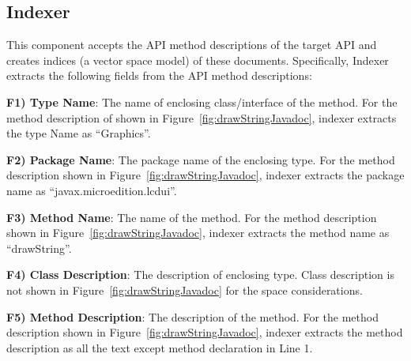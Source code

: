 \subsection{Indexer}
\label{sub:Approach_Indexer}

This component accepts the API method descriptions of the target API
and creates indices (a vector space model) of these documents.
Specifically, Indexer extracts the following fields from the API method descriptions:

 
\textbf{F1) Type Name}: The name of enclosing class/interface of the method. For the method description of  shown in Figure~\ref{fig:drawStringJavadoc}, indexer extracts the type Name as ``Graphics''.
	
\textbf{F2) Package Name}: The package name of the enclosing type. For the method description shown in Figure~\ref{fig:drawStringJavadoc}, indexer extracts the package name as ``javax.microedition.lcdui''.
	
\textbf{F3) Method Name}: The name of the method. For the method description shown in Figure~\ref{fig:drawStringJavadoc}, indexer extracts the method name as ``drawString''.
	
%	
%	
%	
	
\textbf{F4) Class Description}: The description of enclosing type. Class description is not shown in Figure~\ref{fig:drawStringJavadoc} for the space considerations.
	
\textbf{F5) Method Description}: The description of the method. For the method description shown in Figure~\ref{fig:drawStringJavadoc}, indexer extracts the method description as all the text except method declaration in Line 1.


